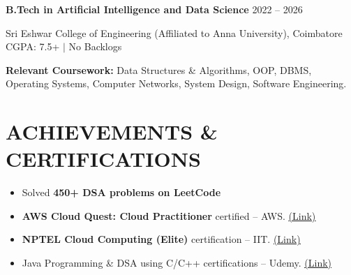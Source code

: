 \documentclass[a4paper,10pt]{article}
\begin{document}
\textbf{B.Tech in Artificial Intelligence and Data Science}
\hfill 2022 -- 2026

Sri Eshwar College of Engineering (Affiliated to Anna University), Coimbatore
\hfill CGPA: 7.5+ \;$|$\; No Backlogs

\textbf{Relevant Coursework:} Data Structures \& Algorithms, OOP, DBMS, Operating Systems, Computer Networks, System Design, Software Engineering.

\section*{ACHIEVEMENTS \& CERTIFICATIONS}

\begin{itemize}[leftmargin=0.16in,itemsep=1.5pt,topsep=2pt]

\item Solved \textbf{450+ DSA problems on LeetCode}

\item \textbf{AWS Cloud Quest: Cloud Practitioner} certified -- AWS. \href{https://www.credly.com/badges/a897819a-28eb-4b6e-83cd-2d551edce741/public_url}{\underline{(Link)}}

\item \textbf{NPTEL Cloud Computing (Elite)} certification -- IIT. \href{https://drive.google.com/file/d/1AlVEIrL-f_hkd__S5qX9O9k5cE_flgpr/view}{\underline{(Link)}}

\item Java Programming \& DSA using C/C++ certifications -- Udemy. \href{https://drive.google.com/file/d/10tCBEQrc_k7DRdEFh7xHsQ77UmIKP3Ha/view}{\underline{(Link)}}

\end{itemize}
\end{document}
